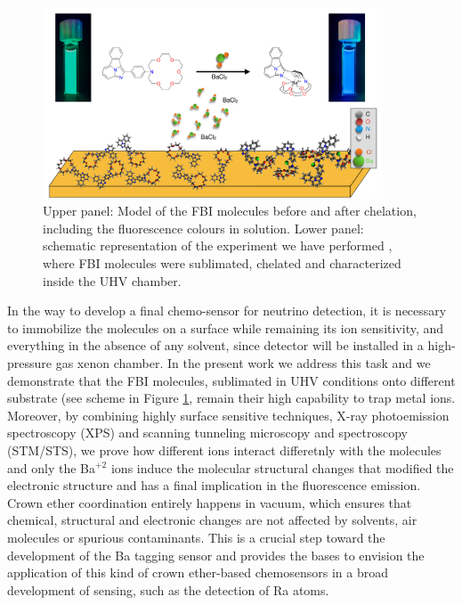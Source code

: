\documentclass[aps,prl,reprint,longbibliography,superscriptaddress]{revtex4-1}
\def\Ba{Ba$^{+2}$ }
\begin{document}
 \begin{figure}[ht!]
	\includegraphics[width=0.9\textwidth]{figures/fig1_fbi_model.pdf}
	\caption{\label{ModeloFBI} 
    Upper panel: Model of the FBI molecules before and after chelation, including the fluorescence colours in solution. Lower panel: schematic representation of the experiment we have performed , where FBI molecules were sublimated, chelated and characterized inside the UHV chamber.}
\end{figure}  

 In the way to develop a final chemo-sensor for neutrino detection, it is necessary to immobilize the molecules on a surface while remaining its ion sensitivity, and everything in the absence of any solvent, since detector will be installed in a high-pressure gas xenon chamber. In the present work we address this task and we demonstrate that the FBI molecules, sublimated in UHV conditions onto different substrate (see scheme in Figure \ref{ModeloFBI}, remain their high capability to trap metal ions. Moreover, by combining highly surface sensitive techniques, X-ray photoemission spectroscopy (XPS) and scanning tunneling microscopy and spectroscopy (STM/STS), we prove how different ions interact differetnly with the molecules and only the \Ba ions induce the molecular structural changes that modified the electronic structure and has a final implication in the fluorescence emission. Crown ether coordination entirely happens in vacuum, which ensures that chemical, structural and electronic changes are not affected by solvents, air molecules or spurious contaminants. This is a crucial step toward the development of the Ba tagging sensor and provides the bases to envision the application of this kind of crown ether-based chemosensors in a broad development of sensing, such as the detection of Ra atoms.
\end{document}

